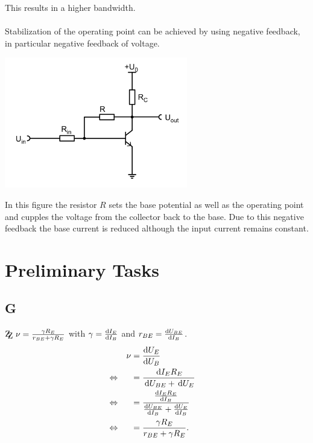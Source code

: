 \documentclass[a4paper,10pt]{article}
\newcommand{\td}{\,\text{d}}
\newcommand{\zz}{\mathrm{Z\kern-.3em\raise-0.5ex\hbox{Z} }}
\newenvironment{Figure}
  {\par\medskip\noindent\minipage{\linewidth}}
  {\endminipage\par\medskip} %
\numberwithin{equation}{section}
\begin{document}
\begin{multicols}{2}
        This results in a higher bandwidth.
        \\\\ Stabilization of the operating point can be achieved by using negative feedback, in particular negative feedback of voltage.
        \begin{Figure}
                \centering
                \includegraphics[width=0.6\textwidth]{spannungsgegenkopplung.png}
        \end{Figure}
        In this figure the resistor $R$ sets the base potential as well as the operating point and cupples the voltage from the collector back to the base.
        Due to this negative feedback the base current is reduced although the input current remains constant.

	\newpage
	\section{Preliminary Tasks}
	\subsection{G}
	$\zz\ \nu =\tfrac{\gamma R_E}{r_{BE}+\gamma R_E}$ with $\gamma =\diff[]{I_E}{I_B}$ and $r_{BE}=\diff[]{U_{BE}}{I_B}$.
	\begin{align}
		                &  & \nu  & = \diff[]{U_E}{U_B}                                                    &  &           \\
		\Leftrightarrow &  &   & = \dfrac{\td I_ER_E}{\td U_{BE}+\td U_E}                               &  & \nonumber \\
		\Leftrightarrow &  &   & = \dfrac{\diff[]{I_ER_E}{I_B}}{\diff[]{U_{BE}}{I_B}+\diff[]{U_E}{I_B}} &  & \nonumber \\
		\Leftrightarrow &  &   & = \dfrac{\gamma R_E}{r_{BE}+\gamma R_E}.                               &  &
	\end{align}


\end{multicols}
\end{document}
